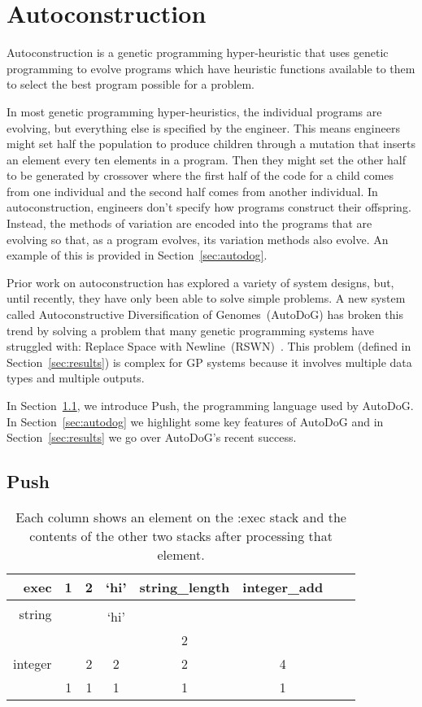 \documentclass{sig-alternate}
\begin{document}
\section{Autoconstruction}
\label{sec:ac}
Autoconstruction is a genetic programming hyper-heur\-istic that uses genetic programming to evolve programs which have heuristic functions available to them to select the best program possible for a problem. 

In most genetic programming hyper-heuristics, the individual programs are evolving, but everything else is specified by the engineer. This means engineers might set half the population to produce children through a mutation that inserts an element every ten elements in a program. Then they might set the other half to be generated by crossover where the first half of the code for a child comes from one individual and the second half comes from another individual. In autoconstruction, engineers don't specify how programs construct their offspring. Instead, the methods of variation are encoded into the programs that are evolving so that, as a program evolves, its variation methods also evolve. An example of this is provided in Section~\ref{sec:autodog}.

Prior work on autoconstruction has explored a variety of system designs, but, until recently, they have only been able to solve simple problems. A new system called Autoconstructive Diversification of Genomes~(AutoDoG) has broken this trend by solving a problem that many genetic programming systems have struggled with: Replace Space with Newline~(RSWN)~\cite{spector:2016}. This problem (defined in Section~\ref{sec:results}) is complex for GP systems because it involves multiple data types and multiple outputs.

In Section~\ref{sec:push}, we introduce Push, the programming language used by AutoDoG. In Section~\ref{sec:autodog} we highlight some key features of AutoDoG and in Section~\ref{sec:results} we go over AutoDoG's recent success.

\subsection{Push}
\label{sec:push}

\begin{table}
	\centering
	\begin{tabular}{|r|c|c|c|c|c|c|c|}
		\hline
		exec & 1 & 2 & `hi' & string\_length & integer\_add \\
		\hline
		\hline
		\multirow{2}{*}{string} & & & & & \\
		& & & `hi' &  &  \\
		\hline
		\multirow{3}{*}{integer} & & & & 2 & \\
		& & 2 & 2 & 2 & 4 \\
		& 1 & 1 & 1 & 1 & 1\\
		\hline
	\end{tabular}
	\caption{Each column shows an element on the :exec stack and the contents of the other two stacks after processing that element.}
	\label{tab:push}
\end{table}
\end{document}
